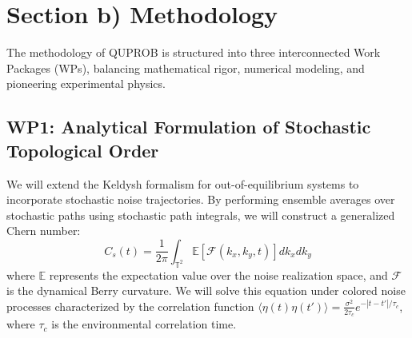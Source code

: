 \section{Section b) Methodology}

The methodology of QUPROB is structured into three interconnected Work Packages (WPs), balancing mathematical rigor, numerical modeling, and pioneering experimental physics.

\pbreak
\begin{center}
\end{center}

\subsection{WP1: Analytical Formulation of Stochastic Topological Order}
We will extend the Keldysh formalism for out-of-equilibrium systems to incorporate stochastic noise trajectories. By performing ensemble averages over stochastic paths using stochastic path integrals, we will construct a generalized Chern number:
\begin{equation}
    C_s(t) = \frac{1}{2\pi} \int_{\mathbb{T}^2} \mathbb{E}\left[ \mathcal{F}(k_x, k_y, t) \right] dk_x dk_y
\end{equation}
where $\mathbb{E}$ represents the expectation value over the noise realization space, and $\mathcal{F}$ is the dynamical Berry curvature. We will solve this equation under colored noise processes characterized by the correlation function $\langle \eta(t)\eta(t') \rangle = \frac{\sigma^2}{2\tau_c} e^{-|t-t'|/\tau_c}$, where $\tau_c$ is the environmental correlation time.

